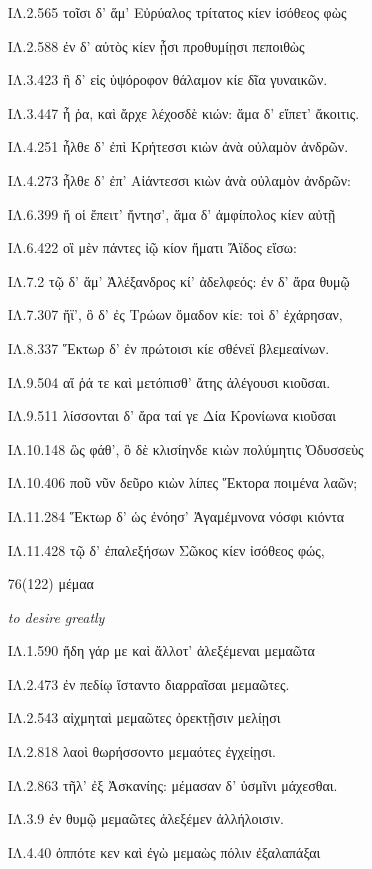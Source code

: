 \begin{enumerate}
{ΙΛ.2.565 τοῖσι δ' ἅμ' Εὐρύαλος τρίτατος κίεν ἰσόθεος φὼς 

ΙΛ.2.588 ἐν δ' αὐτὸς κίεν ᾗσι προθυμίῃσι πεποιθὼς 

ΙΛ.3.423 ἣ δ' εἰς ὑψόροφον θάλαμον κίε δῖα γυναικῶν. 

ΙΛ.3.447 ἦ ῥα, καὶ ἄρχε λέχοσδὲ κιών: ἅμα δ' εἵπετ' ἄκοιτις. 

ΙΛ.4.251 ἦλθε δ' ἐπὶ Κρήτεσσι κιὼν ἀνὰ οὐλαμὸν ἀνδρῶν. 

ΙΛ.4.273 ἦλθε δ' ἐπ' Αἰάντεσσι κιὼν ἀνὰ οὐλαμὸν ἀνδρῶν: 

ΙΛ.6.399 ἥ οἱ ἔπειτ' ἤντησ', ἅμα δ' ἀμφίπολος κίεν αὐτῇ 

ΙΛ.6.422 οἳ μὲν πάντες ἰῷ κίον ἤματι Ἄϊδος εἴσω: 

ΙΛ.7.2 τῷ δ' ἅμ' Ἀλέξανδρος κί' ἀδελφεός: ἐν δ' ἄρα θυμῷ 

ΙΛ.7.307 ἤϊ', ὃ δ' ἐς Τρώων ὅμαδον κίε: τοὶ δ' ἐχάρησαν, 

ΙΛ.8.337 Ἕκτωρ δ' ἐν πρώτοισι κίε σθένεϊ βλεμεαίνων. 

ΙΛ.9.504 αἵ ῥά τε καὶ μετόπισθ' ἄτης ἀλέγουσι κιοῦσαι. 

ΙΛ.9.511 λίσσονται δ' ἄρα ταί γε Δία Κρονίωνα κιοῦσαι 

ΙΛ.10.148 ὣς φάθ', ὃ δὲ κλισίηνδε κιὼν πολύμητις Ὀδυσσεὺς 

ΙΛ.10.406 ποῦ νῦν δεῦρο κιὼν λίπες Ἕκτορα ποιμένα λαῶν; 

ΙΛ.11.284 Ἕκτωρ δ' ὡς ἐνόησ' Ἀγαμέμνονα νόσφι κιόντα 

ΙΛ.11.428 τῷ δ' ἐπαλεξήσων Σῶκος κίεν ἰσόθεος φώς, 

}

\clearpage
\item[\large 76(122)]{\large \g μέμαα	}

\hspace{0.2cm} \textit{ to desire greatly }

{\g
ΙΛ.1.590 ἤδη γάρ με καὶ ἄλλοτ' ἀλεξέμεναι μεμαῶτα 

ΙΛ.2.473 ἐν πεδίῳ ἵσταντο διαρραῖσαι μεμαῶτες. 

ΙΛ.2.543 αἰχμηταὶ μεμαῶτες ὀρεκτῇσιν μελίῃσι 

ΙΛ.2.818 λαοὶ θωρήσσοντο μεμαότες ἐγχείῃσι. 

ΙΛ.2.863 τῆλ' ἐξ Ἀσκανίης: μέμασαν δ' ὑσμῖνι μάχεσθαι. 

ΙΛ.3.9 ἐν θυμῷ μεμαῶτες ἀλεξέμεν ἀλλήλοισιν. 

ΙΛ.4.40 ὁππότε κεν καὶ ἐγὼ μεμαὼς πόλιν ἐξαλαπάξαι 

}
\end{enumerate}
